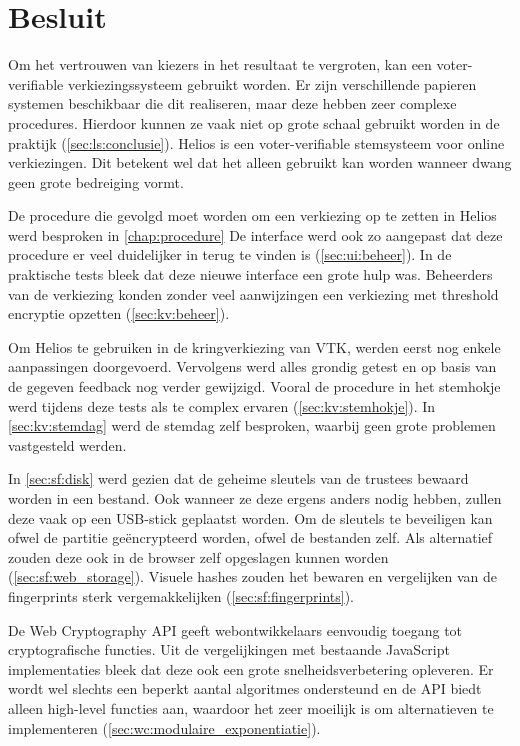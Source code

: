 % 
%

\chapter{Besluit}
\label{chap:besluit}

Om het vertrouwen van kiezers in het resultaat te vergroten, kan een voter-verifiable verkiezingssysteem gebruikt worden. Er zijn verschillende papieren systemen beschikbaar die dit realiseren, maar deze hebben zeer complexe procedures. Hierdoor kunnen ze vaak niet op grote schaal gebruikt worden in de praktijk (\ref{sec:ls:conclusie}). Helios is een voter-verifiable stemsysteem voor online verkiezingen. Dit betekent wel dat het alleen gebruikt kan worden wanneer dwang geen grote bedreiging vormt.

\npar De procedure die gevolgd moet worden om een verkiezing op te zetten in Helios werd besproken in \ref{chap:procedure} De interface werd ook zo aangepast dat deze procedure er veel duidelijker in terug te vinden is (\ref{sec:ui:beheer}). In de praktische tests bleek dat deze nieuwe interface een grote hulp was. Beheerders van de verkiezing konden zonder veel aanwijzingen een verkiezing met threshold encryptie opzetten (\ref{sec:kv:beheer}).

\npar Om Helios te gebruiken in de kringverkiezing van VTK, werden eerst nog enkele aanpassingen doorgevoerd. Vervolgens werd alles grondig getest en op basis van de gegeven feedback nog verder gewijzigd. Vooral de procedure in het stemhokje werd tijdens deze tests als te complex ervaren (\ref{sec:kv:stemhokje}). In \ref{sec:kv:stemdag} werd de stemdag zelf besproken, waarbij geen grote problemen vastgesteld werden.

\npar In \ref{sec:sf:disk} werd gezien dat de geheime sleutels van de trustees bewaard worden in een bestand. Ook wanneer ze deze ergens anders nodig hebben, zullen deze vaak op een USB-stick geplaatst worden. Om de sleutels te beveiligen kan ofwel de partitie ge\"encrypteerd worden, ofwel de bestanden zelf. Als alternatief zouden deze ook in de browser zelf opgeslagen kunnen worden (\ref{sec:sf:web_storage}). Visuele hashes zouden het bewaren en vergelijken van de fingerprints sterk vergemakkelijken (\ref{sec:sf:fingerprints}).

\npar De Web Cryptography API geeft webontwikkelaars eenvoudig toegang tot cryptografische functies. Uit de vergelijkingen met bestaande JavaScript implementaties bleek dat deze ook een grote snelheidsverbetering opleveren. Er wordt wel slechts een beperkt aantal algoritmes ondersteund en de API biedt alleen high-level functies aan, waardoor het zeer moeilijk is om alternatieven te implementeren (\ref{sec:wc:modulaire_exponentiatie}).
